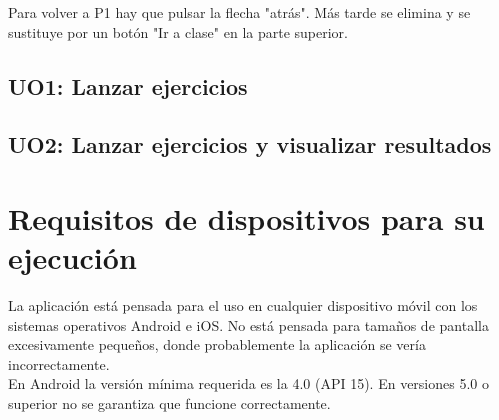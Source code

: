 Para volver a P1 hay que pulsar la flecha "atrás". Más tarde se elimina y se sustituye por un botón "Ir a clase" en la parte superior.\\

\subsection{UO1: Lanzar ejercicios}
\label{analisis-de-requisitos:funcionales:uo1}

\subsection{UO2: Lanzar ejercicios y visualizar resultados}
\label{analisis-de-requisitos:funcionales:uo2}

\section{Requisitos de dispositivos para su ejecución}
\label{analisis-de-requisitos:dispositivos}

La aplicación está pensada para el uso en cualquier dispositivo móvil con los sistemas operativos Android e iOS. No está pensada para tamaños de pantalla excesivamente pequeños, donde probablemente la aplicación se vería incorrectamente.\\

En Android la versión mínima requerida es la 4.0 (API 15). En versiones 5.0 o superior no se garantiza que funcione correctamente.\\
